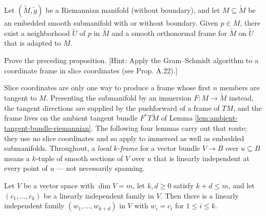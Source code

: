 \begin{proposition}
\label{prop:adapted-orthonormal-frames}
Let $(\tilde{M}, \tilde{g})$ be a Riemannian manifold (without boundary), and let $M \subseteq \tilde{M}$ be an embedded smooth submanifold with or without boundary. Given $p \in M$, there exist a neighborhood $\tilde{U}$ of $p$ in $\tilde{M}$ and a smooth orthonormal frame for $\tilde{M}$ on $\tilde{U}$ that is adapted to $M$.
\end{proposition}

\begin{exercise}
\label{exer:gram-schmidt-adapted-frame}
Prove the preceding proposition. [Hint: Apply the Gram--Schmidt algorithm to a coordinate frame in slice coordinates (see Prop. A.22).]
\end{exercise}

Slice coordinates are only one way to produce a frame whose first $n$ members are tangent to $M$. Presenting the submanifold by an immersion $F : M \to \tilde M$ instead, the tangent directions are supplied by the pushforward of a frame of $TM$, and the frame lives on the ambient tangent bundle $F^* T\tilde M$ of Lemma \ref{lem:ambient-tangent-bundle-riemannian}. The following four lemmas carry out that route; they use no slice coordinates and so apply to immersed as well as embedded submanifolds. Throughout, a \textit{local $k$-frame} for a vector bundle $V \to B$ over $u \subseteq B$ means a $k$-tuple of smooth sections of $V$ over $u$ that is linearly independent at every point of $u$ — not necessarily spanning.

\begin{lemma}
\label{lem:ordered-linear-extension}
\leanok
Let $V$ be a vector space with $\dim V = m$, let $k, d \geq 0$ satisfy $k + d \leq m$, and let $(c_1, \ldots, c_k)$ be a linearly independent family in $V$. Then there is a linearly independent family $(w_1, \ldots, w_{k+d})$ in $V$ with $w_i = c_i$ for $1 \leq i \leq k$.
\end{lemma}

